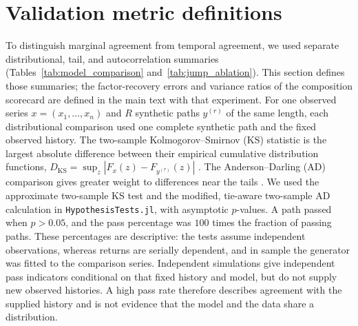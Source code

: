 \section{Validation metric definitions}
\label{sec:supp-validation}

To distinguish marginal agreement from temporal agreement, we used
separate distributional, tail, and autocorrelation summaries
(Tables~\ref{tab:model_comparison} and~\ref{tab:jump_ablation}).
This section defines those summaries; the factor-recovery errors and
variance ratios of the composition scorecard are defined in the main
text with that experiment. For one observed series $x=(x_1,\ldots,x_n)$ and $R$ synthetic
paths $y^{(r)}$ of the same length, each distributional comparison
used one complete synthetic path and the fixed observed history.
The two-sample Kolmogorov--Smirnov (KS) statistic is the largest
absolute difference between their empirical cumulative distribution
functions, $D_{\mathrm{KS}}=\sup_z|F_x(z)-F_{y^{(r)}}(z)|$
\cite{kolmogorov1933,smirnov1948}. The Anderson--Darling (AD)
comparison gives greater weight to differences near the tails
\cite{andersonDarling1952}. We used the approximate two-sample KS
test and the modified, tie-aware two-sample AD calculation in
\texttt{HypothesisTests.jl}, with asymptotic $p$-values. A path
passed when $p>0.05$, and the pass percentage was $100$ times the
fraction of passing paths. These percentages are descriptive: the tests assume independent
observations, whereas returns are serially dependent, and in sample
the generator was fitted to the comparison series. Independent
simulations give independent pass indicators conditional on that
fixed history and model, but do not supply new observed histories. A high pass rate therefore describes agreement
with the supplied history and is not evidence that the model and the
data share a distribution.

